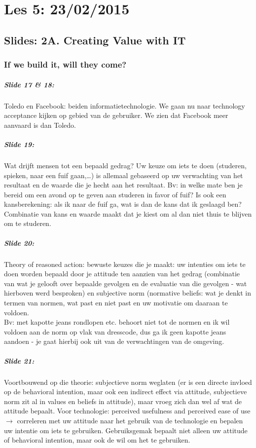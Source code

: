 \documentclass[10pt,a4paper]{report}
\begin{document}
\chapter{Les 5: 23/02/2015}
\section{Slides: 2A. Creating Value with IT}
\subsection{If we build it, will they come?}
\paragraph{Slide 17 \& 18:}Toledo en Facebook: beiden informatietechnologie. We gaan nu naar technology acceptance kijken op gebied van de gebruiker. We zien dat Facebook meer aanvaard is dan Toledo.

\paragraph{Slide 19:}Wat drijft mensen tot een bepaald gedrag? Uw keuze om iets te doen (studeren, spieken, naar een fuif gaan,…) is allemaal gebaseerd op uw verwachting van het resultaat en de waarde die je hecht aan het resultaat.
Bv: in welke mate ben je bereid om een avond op te geven aan studeren in favor of fuif? Is ook een kansberekening: als ik naar de fuif ga, wat is dan de kans dat ik geslaagd ben? Combinatie van kans en waarde maakt dat je kiest om al dan niet thuis te blijven om te studeren.

\paragraph{Slide 20:}Theory of reasoned action: bewuste keuzes die je maakt: uw intenties om iets te doen worden bepaald door je attitude ten aanzien van het gedrag (combinatie van wat je gelooft over bepaalde gevolgen en de evaluatie van die gevolgen - wat hierboven werd besproken) en subjective norm (normative beliefs: wat je denkt in termen van normen, wat past en niet past en uw motivatie om daaraan te voldoen.\\ 
Bv: met kapotte jeans rondlopen etc. behoort niet tot de normen en ik wil voldoen aan de norm op vlak van dresscode, dus ga ik geen kapotte jeans aandoen - je gaat hierbij ook uit van de verwachtingen van de omgeving.

\paragraph{Slide 21:}Voortbouwend op die theorie: subjectieve norm weglaten (er is een directe invloed op de behavioral intention, maar ook een indirect effect via attitude, subjectieve norm zit al in values en beliefs in attitude), maar vroeg zich dan wel af wat de attitude bepaalt. Voor technologie: perceived usefulness and perceived ease of use $\rightarrow$ correleren met uw attitude naar het gebruik van de technologie en bepalen uw intentie om iets te gebruiken. Gebruiksgemak bepaalt niet alleen uw attitude of behavioral intention, maar ook de wil om het te gebruiken.
\end{document}
